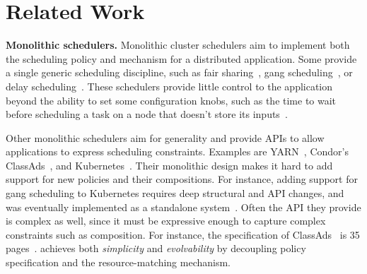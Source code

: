 \section{Related Work}
\label{sec:related-work}





\textbf{Monolithic schedulers.}
Monolithic cluster schedulers aim to implement both the scheduling policy and mechanism for a distributed application.
Some provide a single generic scheduling discipline, such as fair sharing~\cite{isardquincy,ghodsi2011dominant}, gang scheduling~\cite{mpi}, or delay scheduling~\cite{delay-scheduling}. These schedulers provide little control to the application beyond the ability to set some configuration knobs, such as the time to wait before scheduling a task on a node that doesn't store its inputs~\cite{delay-scheduling}.

Other monolithic schedulers aim for generality and provide APIs to allow applications to express scheduling constraints.
Examples are YARN~\cite{yarn}, Condor's ClassAds~\cite{condor}, and Kubernetes~\cite{kubernetes}.
Their monolithic design makes it hard to add support for new policies and their compositions.
For instance, adding support for gang scheduling to Kubernetes requires deep structural and API changes, and was eventually implemented as a standalone system~\cite{kubernetes-gang-scheduling}.
Often the API they provide is complex as well, since it must be expressive enough to capture complex constraints such as composition. 
For instance, the specification of ClassAds~\cite{classads} is 35 pages~\cite{classads-refman}.
\name{} achieves both \textit{simplicity} and \textit{evolvability} by decoupling policy specification and the resource-matching mechanism.

